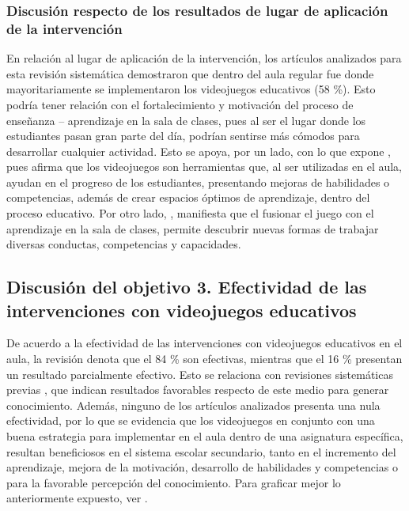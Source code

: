 \documentclass[spanish]{textolivre}
\begin{document}
\subsubsection{Discusión respecto de los resultados de lugar de aplicación de la intervención}\label{sec-codigos}
En relación al lugar de aplicación de la intervención, los artículos analizados para esta revisión sistemática demostraron que dentro del aula regular fue donde mayoritariamente se implementaron los videojuegos educativos (58 \%). Esto podría tener relación con el fortalecimiento y motivación del proceso de enseñanza – aprendizaje en la sala de clases, pues al ser el lugar donde los estudiantes pasan gran parte del día, podrían sentirse más cómodos para desarrollar cualquier actividad. Esto se apoya, por un lado, con lo que expone \textcite{escobar_videojuego_2019}, pues afirma que los videojuegos son herramientas que, al ser utilizadas en el aula, ayudan en el progreso de los estudiantes, presentando mejoras de habilidades o competencias, además de crear espacios óptimos de aprendizaje, dentro del proceso educativo. Por otro lado, \textcite{reina_gamificacion_2019}, manifiesta que el fusionar el juego con el aprendizaje en la sala de clases, permite descubrir nuevas formas de trabajar diversas conductas, competencias y capacidades.

\subsection{Discusión del objetivo 3. Efectividad de las intervenciones con videojuegos educativos}\label{sec-contributors-expl}
De acuerdo a la efectividad de las intervenciones con videojuegos educativos en el aula, la revisión denota que el 84 \% son efectivas, mientras que el 16 \% presentan un resultado parcialmente efectivo. Esto se relaciona con revisiones sistemáticas previas \cite{araujo_exergames_2017,diaz_history_2018,sousa_videogames_2018,torres-toukoumidis_desarrollo_2016}, que indican resultados favorables respecto de este medio para generar conocimiento. Además, ninguno de los artículos analizados presenta una nula efectividad, por lo que se evidencia que los videojuegos en conjunto con una buena estrategia para implementar en el aula dentro de una asignatura específica, resultan beneficiosos en el sistema escolar secundario, tanto en el incremento del aprendizaje, mejora de la motivación, desarrollo de habilidades y competencias o para la favorable percepción del conocimiento. Para graficar mejor lo anteriormente expuesto, ver . 
\end{document}
